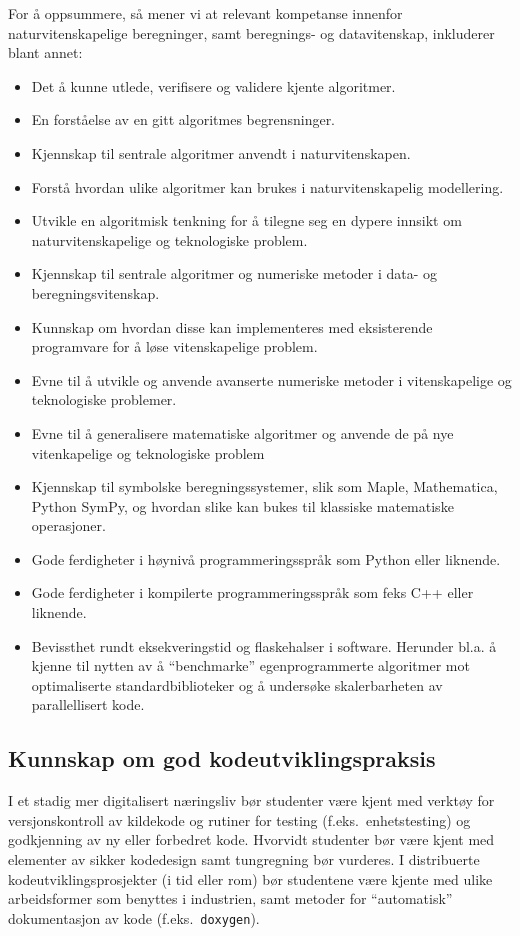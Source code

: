 \documentclass{article}
\begin{document}
For å oppsummere, så mener vi at relevant kompetanse innenfor naturvitenskapelige beregninger, samt beregnings- og datavitenskap, inkluderer blant annet:
\begin{itemize}
  \item Det å kunne utlede, verifisere og validere kjente algoritmer.
  \item En forståelse av en gitt algoritmes begrensninger.
  \item Kjennskap til sentrale algoritmer anvendt i naturvitenskapen.
  \item Forstå hvordan ulike algoritmer kan brukes i naturvitenskapelig modellering.
  \item Utvikle en algoritmisk tenkning for å tilegne seg en dypere innsikt om naturvitenskapelige og teknologiske problem.
  \item Kjennskap til sentrale algoritmer og numeriske metoder i data- og beregningsvitenskap.
  \item Kunnskap om hvordan disse kan implementeres med eksisterende programvare for å løse vitenskapelige problem.
  \item Evne til å utvikle og anvende avanserte numeriske metoder i vitenskapelige og teknologiske problemer.
  \item Evne til å generalisere matematiske algoritmer og anvende de på nye vitenkapelige og teknologiske problem
  \item Kjennskap til symbolske beregningssystemer, slik som Maple, Mathematica, Python SymPy, og hvordan slike kan bukes til klassiske matematiske operasjoner.
  \item Gode ferdigheter i høynivå programmeringsspråk som Python eller liknende.
  \item Gode ferdigheter i kompilerte programmeringsspråk som feks C++ eller liknende.
  \item Bevissthet rundt eksekveringstid og flaskehalser i software. Herunder bl.a. å kjenne til nytten av å  ``benchmarke'' egenprogrammerte algoritmer mot optimaliserte standardbiblioteker og å undersøke skalerbarheten av parallellisert kode.
\end{itemize}

\subsection{Kunnskap om god kodeutviklingspraksis}
I et stadig mer digitalisert næringsliv bør studenter være kjent med verktøy for versjonskontroll av kildekode og rutiner for testing (f.eks.~enhetstesting) og godkjenning av ny eller forbedret kode. Hvorvidt studenter bør være kjent med elementer av sikker kodedesign samt tungregning bør vurderes. I distribuerte kodeutviklingsprosjekter (i tid eller rom) bør studentene være kjente med ulike  arbeidsformer som benyttes i industrien, samt metoder for ``automatisk'' dokumentasjon av kode (f.eks.~\verb+doxygen+).
\end{document}
